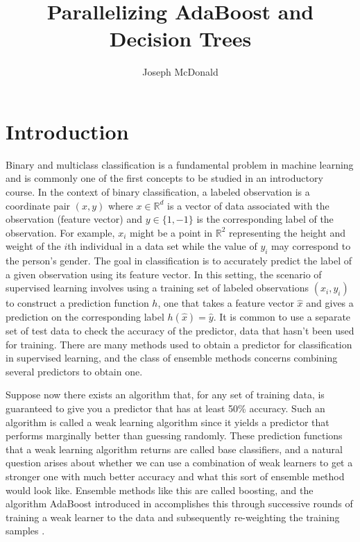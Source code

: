 \documentclass[12pt]{article}
\author{Joseph McDonald}
\title{Parallelizing AdaBoost and Decision Trees}
\begin{document}

\maketitle

\section{Introduction}
Binary and multiclass classification is a fundamental problem in machine learning and is commonly one of the first concepts to be studied in an introductory course. In the context of binary classification, a labeled observation is a coordinate pair $(x, y)$ where $x\in\mathbb{R}^d$ is a vector of data associated with the observation (feature vector) and $y\in\{1, -1\}$ is the corresponding label of the observation. For example, $x_i$ might be a point in $\mathbb{R}^2$ representing the height and weight of the $i$th individual in a data set while the value of $y_i$ may correspond to the person's gender. The goal in classification is to accurately predict the label of a given observation using its feature vector. In this setting, the scenario of supervised learning involves using a training set of labeled observations $(x_i, y_i)$ to construct a prediction function $h$, one that takes a feature vector $\hat{x}$ and gives a prediction on the corresponding label $h(\hat{x})=\hat{y}$. It is common to use a separate set of test data to check the accuracy of the predictor, data that hasn't been used for training. There are many methods used to obtain a predictor for classification in supervised learning, and the class of ensemble methods concerns combining several predictors to obtain one.

Suppose now there exists an algorithm that, for any set of training data, is guaranteed to give you a predictor that has at least 50\% accuracy. Such an algorithm is called a weak learning algorithm since it yields a predictor that performs marginally better than guessing randomly. These prediction functions that a weak learning algorithm returns are called base classifiers, and a natural question arises about whether we can use a combination of weak learners to get a stronger one with much better accuracy and what this sort of ensemble method would look like. Ensemble methods like this are called boosting, and the algorithm AdaBoost introduced in \cite{no1} accomplishes this through successive rounds of training a weak learner to the data and subsequently re-weighting the training samples \cite{no1}.
\end{document}
